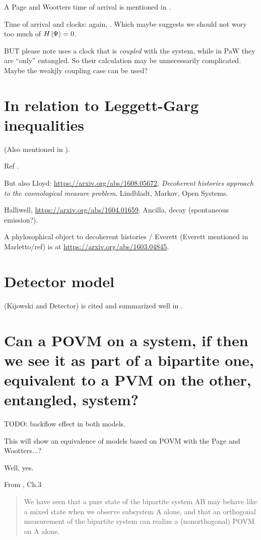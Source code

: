 A Page and Wootters time of arrival is mentioned in \cite{Gambini_PW}.

Time of arrival and clocks: again, \cite{YearsleyHalliwell_Clocks}.
Which maybe suggests we should not wory too much of $H\ket{\Psi} = 0$. 

BUT please note \cite{YearsleyHalliwell_Clocks} uses a clock that is
\emph{coupled} with the system, while in PaW they are ``only'' entangled.
So their calculation may be unnecessarily complicated.
Maybe the weakjly coupling case can be used?

\section{In relation to Leggett-Garg inequalities}
(Also mentioned in \cite{Moreva_position}).

Ref \cite{LeggettGarg+PageWootters}.

But also Lloyd: \url{https://arxiv.org/abs/1608.05672},
\emph{Decoherent histories approach to the cosmological measure problem}.
Lindbladt, Markov, Open Systems.

Halliwell, \url{https://arxiv.org/abs/1604.01659}. Ancilla, decay (spontaneous emission?).

A phylosophical object to decoherent histories / Everett (Everett mentioned in Marletto/ref)
is at
\url{https://arxiv.org/abs/1603.04845}.
\section{Detector model}

\cite{TQM2} (Kijowski and Detector) is cited and summarized well in
\cite{Halliwell_Detector}.



\section{Can a POVM on a system, if then we see it as part of a bipartite one,
equivalent to a PVM on the other, entangled, system?}

TODO: backflow effect in both models.

This will show an equivalence of models based on POVM with the Page and Wootters...?

Well, yes.

From \cite{PreskillNotes}, Ch.3 
\begin{quotation}
We have seen that
a pure state of the bipartite system AB may behave like a mixed state
when we observe subsystem A alone, and that an orthogonal measurement
of the bipartite system can realize a (nonorthogonal) POVM on A alone.
\end{quotation}

